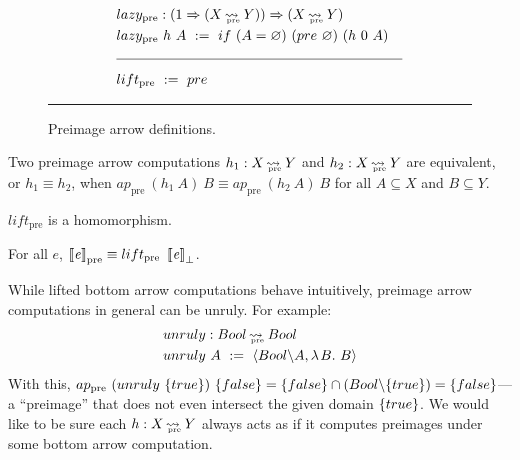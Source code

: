 \documentclass{llncs}
\newcommand{\arrow}{\rightsquigarrow}
\newcommand{\arrowlift}{\ensuremath{lift}}
\newcommand{\arrowlazy}{\ensuremath{lazy}}
\newcommand{\pre}{_\mathrm{pre}}
\DeclareMathOperator{\preto}{\arrow_{\mspace{-19mu}\pre}}
\newcommand{\liftpre}{\arrowlift\pre}
\newcommand{\lazypre}{\arrowlazy\pre}
\begin{document}
\begin{figure*}[t]
\begin{align*}
\begin{aligned}[t]
\\[-6pt]
	&\begin{aligned}[t]
		&\lazypre : (1 \tto (X \preto Y)) \tto (X \preto Y) \\
		&\lazypre~h~A \ := \ if~(A = \emptyset)~(pre~\emptyset)~(h~0~A)
	\end{aligned} \\
\\[-6pt]
\hline
\\[-6pt]
	&\begin{aligned}[t]
		&\liftpre \ := \ pre
	\end{aligned}
\end{aligned}
\end{align*}
\hrule
\caption[ ]{Preimage arrow definitions.}
\label{fig:preimage-arrow-defs}
\end{figure*}

\begin{definition}
Two preimage arrow computations $h_1 : X \preto Y$ and $h_2 : X \preto Y$ are equivalent, or $h_1 \equiv h_2$, when 
$ap\pre~(h_1~A)~B \equiv ap\pre~(h_2~A)~B$ for all $A \subseteq X$ and $B \subseteq Y$.
\end{definition}

\begin{theorem}
$\liftpre$ is a homomorphism.
\end{theorem}

\begin{corollary}
\label{cor:preimage-arrow-correctness}
For all $\mathit{e}$, $\meaningof{\mathit{e}}\pre \equiv \liftpre~\meaningof{\mathit{e}}_\bot$.
\end{corollary}

While lifted bottom arrow computations behave intuitively, preimage arrow computations in general can be unruly.
For example:
\begin{equation}
\begin{aligned}
	&unruly : Bool \preto Bool \\
	&unruly~A \ := \ \pair{Bool \w A, \fun{B} B}
\end{aligned}
\end{equation}
With this, $ap\pre~(unruly~\set{true})~\set{false} = \set{false} \i (Bool \w \set{true}) = \set{false}$---a ``preimage'' that does not even intersect the given domain $\{{true}\}$.
We would like to be sure each $h : X \preto Y$ always acts as if it computes preimages under some bottom arrow computation.
\end{document}
